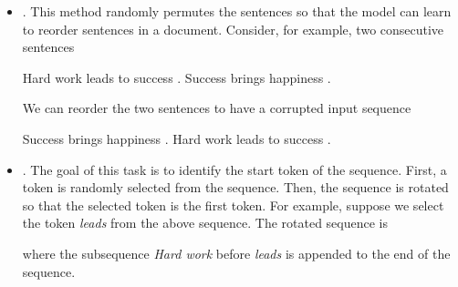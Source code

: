 \begin{itemize}
\item \vspace{0.5em} . This method randomly permutes the sentences so that the model can learn to reorder sentences in a document. Consider, for example, two consecutive sentences

    \begin{center}
    Hard work leads to success . Success brings happiness .
    \end{center}

    We can reorder the two sentences to have a corrupted input sequence

    \begin{center}
    Success brings happiness . Hard work leads to success .
    \end{center}

\item \vspace{0.3em} . The goal of this task is to identify the start token of the sequence. First, a token is randomly selected from the sequence. Then, the sequence is rotated so that the selected token is the first token. For example, suppose we select the token \textit{leads} from the above sequence. The rotated sequence is

    \begin{center}
    \end{center}

    \noindent where the subsequence \textit{Hard work} before \textit{leads} is appended to the end of the sequence.

\end{itemize}
\vspace{0.5em}

